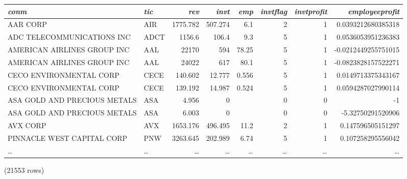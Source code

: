 \begin{center}
\begin{tabular}{l | l | r | r | r | r | r | r}
\textit{conm} & \textit{tic} & \textit{rev} & \textit{invt} & \textit{emp} & \textit{invtflag} & \textit{invtprofit} & \textit{employeeprofit} \\
\hline
AAR CORP & AIR & 1775.782 & 507.274 & 6.1 & 2 & 1 & 0.0393212680385318 \\
ADC TELECOMMUNICATIONS INC & ADCT & 1156.6 & 106.4 & 9.3 & 5 & 1 & 0.0536053951236383 \\
AMERICAN AIRLINES GROUP INC & AAL & 22170 & 594 & 78.25 & 5 & 1 & -0.0212449255751015 \\
AMERICAN AIRLINES GROUP INC & AAL & 24022 & 617 & 80.1 & 5 & 1 & -0.0823828157522271 \\
CECO ENVIRONMENTAL CORP & CECE & 140.602 & 12.777 & 0.556 & 5 & 1 & 0.0149713375343167 \\
CECO ENVIRONMENTAL CORP & CECE & 139.192 & 14.987 & 0.524 & 5 & 1 & 0.0594287027990114 \\
ASA GOLD AND PRECIOUS METALS & ASA & 4.956 & 0 &  & 0 & 0 & -1 \\
ASA GOLD AND PRECIOUS METALS & ASA & 6.003 & 0 &  & 0 & 0 & -5.32750291520906 \\
AVX CORP & AVX & 1653.176 & 496.495 & 11.2 & 2 & 1 & 0.147596505151297 \\
PINNACLE WEST CAPITAL CORP & PNW & 3263.645 & 202.989 & 6.74 & 5 & 1 & 0.107258295556042 \\
\ldots & \ldots & \ldots & \ldots & \ldots & \ldots & \ldots & \ldots \\
\end{tabular}

\noindent (21553 rows) \\
\end{center}

